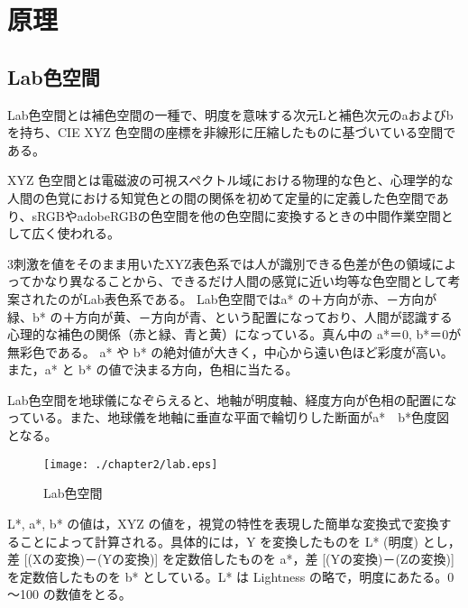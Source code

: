 \chapter{原理}

\section{Lab色空間}
Lab色空間とは補色空間の一種で、明度を意味する次元Lと補色次元のaおよびbを持ち、CIE XYZ 色空間の座標を非線形に圧縮したものに基づいている空間である。\par
XYZ 色空間とは電磁波の可視スペクトル域における物理的な色と、心理学的な人間の色覚における知覚色との間の関係を初めて定量的に定義した色空間であり、sRGBやadobeRGBの色空間を他の色空間に変換するときの中間作業空間として広く使われる。\par
3刺激を値をそのまま用いたXYZ表色系では人が識別できる色差が色の領域によってかなり異なることから、できるだけ人間の感覚に近い均等な色空間として考案されたのがLab表色系である。\cite{2}
\newpage
Lab色空間ではa* の＋方向が赤、－方向が緑、b* の＋方向が黄、－方向が青、という配置になっており、人間が認識する心理的な補色の関係（赤と緑、青と黄）になっている。真ん中の a*＝0,  b*＝0が無彩色である。 a* や b* の絶対値が大きく，中心から遠い色ほど彩度が高い。また，a* と b* の値で決まる方向，色相に当たる。\cite{3}\par
Lab色空間を地球儀になぞらえると、地軸が明度軸、経度方向が色相の配置になっている。また、地球儀を地軸に垂直な平面で輪切りした断面がa*　b*色度図となる。\par
\begin{figure}[htbp]
  \begin{center}
    \texttt{[image: ./chapter2/lab.eps]}
    \caption{Lab色空間}
    \label{fig:lab}
  \end{center}
\end{figure}
L*, a*, b* の値は，XYZ の値を，視覚の特性を表現した簡単な変換式で変換することによって計算される。具体的には，Y を変換したものを  L* (明度) とし， 差 [(Xの変換)－(Yの変換)] を定数倍したものを a*，差 [(Yの変換)－(Zの変換)] を定数倍したものを b* としている。L* は Lightness の略で，明度にあたる。0～100 の数値をとる。\par

\newpage
